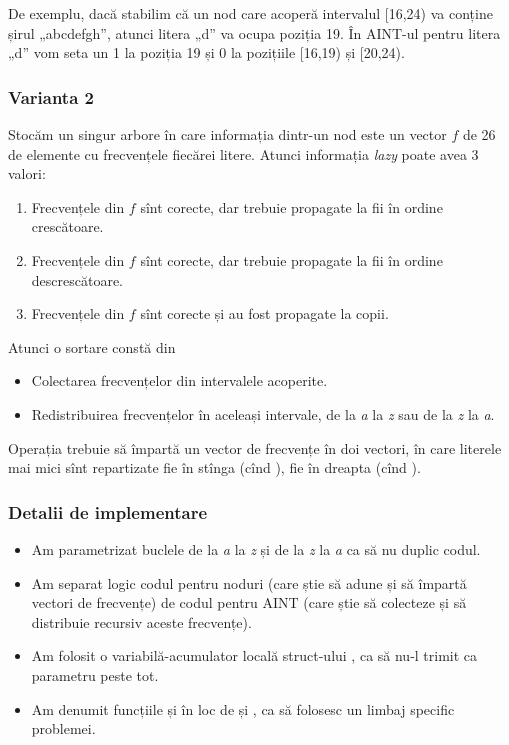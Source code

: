 \documentclass[../main.tex]{subfiles}
\begin{document}
De exemplu, dacă stabilim că un nod care acoperă intervalul [16,24) va conține șirul „abcdefgh”, atunci litera „d” va ocupa poziția 19. În AINT-ul pentru litera „d” vom seta un 1 la poziția 19 și 0 la pozițiile [16,19) și [20,24).

\subsubsection*{Varianta 2}

Stocăm un singur arbore în care informația dintr-un nod este un vector $f$ de 26 de elemente cu frecvențele fiecărei litere. Atunci informația \textit{lazy} poate avea 3 valori:

\begin{enumerate}
  \item Frecvențele din $f$ sînt corecte, dar trebuie propagate la fii în ordine crescătoare.

  \item Frecvențele din $f$ sînt corecte, dar trebuie propagate la fii în ordine descrescătoare.

  \item Frecvențele din $f$ sînt corecte și au fost propagate la copii.
\end{enumerate}

Atunci o sortare constă din

\begin{itemize}
  \item Colectarea frecvențelor din intervalele acoperite.

  \item Redistribuirea frecvențelor în aceleași intervale, de la \textit{a} la \textit{z} sau de la \textit{z} la \textit{a}.
\end{itemize}

Operația  trebuie să împartă un vector de frecvențe în doi vectori, în care literele mai mici sînt repartizate fie în stînga (cînd ), fie în dreapta (cînd ).

\subsubsection*{Detalii de implementare}

\begin{itemize}
  \item Am parametrizat buclele de la \textit{a} la \textit{z} și de la \textit{z} la \textit{a} ca să nu duplic codul.

  \item Am separat logic codul pentru noduri (care știe să adune și să împartă vectori de frecvențe) de codul pentru AINT (care știe să colecteze și să distribuie recursiv aceste frecvențe).

  \item Am folosit o variabilă-acumulator locală struct-ului , ca să nu-l trimit ca parametru peste tot.

  \item Am denumit funcțiile  și  în loc de  și , ca să folosesc un limbaj specific problemei.
\end{itemize}
\end{document}
